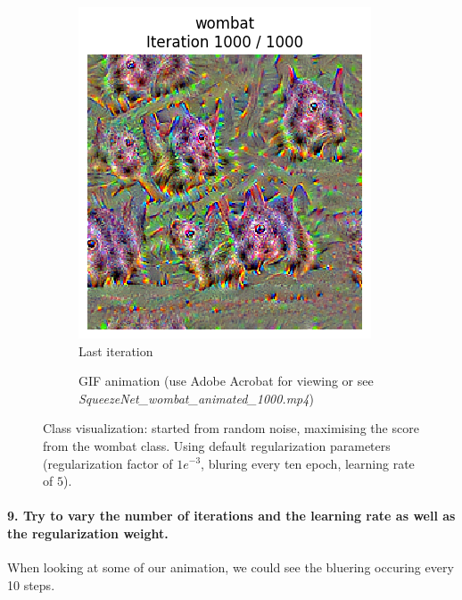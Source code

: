 \begin{figure}[H]
    \centering
    \begin{subfigure}{.5\textwidth}
        \centering
        \includegraphics[width=.7\linewidth]{figs/2b/SqueezeNet/SqueezeNet_wombat_animated_1000_last_frame.png}
        \caption{Last iteration}
        \label{fig:class_viz_wombat:png}
    \end{subfigure}%
    \begin{subfigure}{.5\textwidth}
        \centering
        \caption{GIF animation (use Adobe Acrobat for viewing or see \textit{SqueezeNet\_wombat\_animated\_1000.mp4})}
        \label{fig:class_viz_wombat:vid}
    \end{subfigure}

    \caption{Class visualization: started from random noise, maximising the score from the wombat class. Using default regularization parameters (regularization factor of $1e^{-3}$, bluring every ten epoch, learning rate of $5$).}
    \label{fig:class_viz_wombat}
\end{figure}

\paragraph*{9. Try to vary the number of iterations and the learning rate as well as the regularization weight.}
When looking at some of our animation, we could see the bluering occuring every 10 steps.

